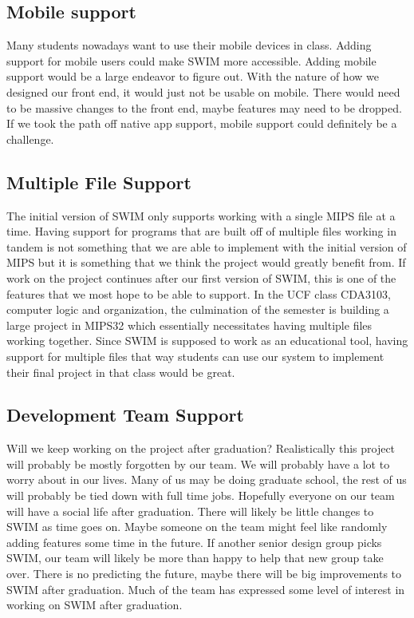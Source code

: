 \documentclass[
    parskip=half,
    fontsize=12pt,
    titlepage=firstiscover,
    toc=bibliography,
    numbers=endperiod
]{scrartcl}
\begin{document}
\subsection{Mobile support}

Many students nowadays want to use their mobile devices in class. Adding
support for mobile users could make SWIM more accessible. Adding mobile
support would be a large endeavor to figure out. With the nature of how
we designed our front end, it would just not be usable on mobile. There
would need to be massive changes to the front end, maybe features may
need to be dropped. If we took the path off native app support, mobile
support could definitely be a challenge.

\subsection{Multiple File Support}

The initial version of SWIM only supports working with a single MIPS
file at a time. Having support for programs that are built off of
multiple files working in tandem is not something that we are able to
implement with the initial version of MIPS but it is something that we
think the project would greatly benefit from. If work on the project
continues after our first version of SWIM, this is one of the features
that we most hope to be able to support. In the UCF class CDA3103,
computer logic and organization, the culmination of the semester is
building a large project in MIPS32 which essentially necessitates having
multiple files working together. Since SWIM is supposed to work as an
educational tool, having support for multiple files that way students
can use our system to implement their final project in that class would
be great.

\subsection{Development Team Support}

Will we keep working on the project after graduation? Realistically this
project will probably be mostly forgotten by our team. We will probably
have a lot to worry about in our lives. Many of us may be doing graduate
school, the rest of us will probably be tied down with full time jobs.
Hopefully everyone on our team will have a social life after graduation.
There will likely be little changes to SWIM as time goes on. Maybe
someone on the team might feel like randomly adding features some time
in the future. If another senior design group picks SWIM, our team will
likely be more than happy to help that new group take over. There is no
predicting the future, maybe there will be big improvements to SWIM
after graduation. Much of the team has expressed some level of interest
in working on SWIM after graduation.


\printbibliography
\end{document}
